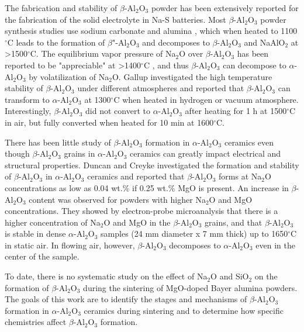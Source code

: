The fabrication and stability of $\beta$-Al$_{2}$O$_{3}$ powder has been extensively reported for the fabrication of the solid electrolyte in Na-S batteries. Most $\beta$-Al$_{2}$O$_{3}$ powder synthesis studies use sodium carbonate and alumina \cite{Vries1969,Kummer1972a,Ray1975}, which when heated to 1100$^{\circ}$C leads to the formation of $\beta$"-Al$_{2}$O$_{3}$ and decomposes to $\beta$-Al$_{2}$O$_{3}$ and NaAlO$_{2}$ at >1500$^{\circ}$C. The equilibrium vapor pressure of Na$_{2}$O over $\beta$-Al$_{2}$O$_{3}$ has been reported to be "appreciable" at >1400$^{\circ}$C \cite{Kummer1972a}, and thus $\beta$-Al$_{2}$O$_{3}$ can decompose to $\alpha$-Al$_{2}$O$_{3}$ by volatilization of Na$_{2}$O. Gallup \cite{Gallup1935} investigated the high temperature stability of $\beta$-Al$_{2}$O$_{3}$ under different atmospheres and reported that $\beta$-Al$_{2}$O$_{3}$ can transform to $\alpha$-Al$_{2}$O$_{3}$ at 1300$^{\circ}$C when heated in hydrogen or vacuum atmosphere. Interestingly, $\beta$-Al$_{2}$O$_{3}$ did not convert to $\alpha$-Al$_{2}$O$_{3}$ after heating for 1 h at 1500$^{\circ}$C in air, but fully converted when heated for 10 min at 1600$^{\circ}$C. 

There has been little study of $\beta$-Al$_{2}$O$_{3}$ formation in $\alpha$-Al$_{2}$O$_{3}$ ceramics even though $\beta$-Al$_{2}$O$_{3}$ grains in $\alpha$-Al$_{2}$O$_{3}$ ceramics can greatly impact electrical and structural properties. Duncan and Creyke \cite{Duncan1969a} investigated the formation and stability of $\beta$-Al$_{2}$O$_{3}$ in $\alpha$-Al$_{2}$O$_{3}$ ceramics and reported that $\beta$-Al$_{2}$O$_{3}$ forms at Na$_{2}$O concentrations as low as 0.04 wt.\% if 0.25 wt.\% MgO is present. An increase in $\beta$-Al$_{2}$O$_{3}$ content was observed for powders with higher Na$_{2}$O and MgO concentrations. They showed by electron-probe microanalysis that there is a higher concentration of Na$_{2}$O and MgO in the $\beta$-Al$_{2}$O$_{3}$ grains, and that $\beta$-Al$_{2}$O$_{3}$ is stable in dense $\alpha$-Al$_{2}$O$_{3}$ samples (24 mm diameter x 7 mm thick) up to 1650$^{\circ}$C in static air. In flowing air, however, $\beta$-Al$_{2}$O$_{3}$ decomposes to $\alpha$-Al$_{2}$O$_{3}$ even in the center of the sample.

To date, there is no systematic study on the effect of Na$_{2}$O and SiO$_{2}$ on the formation of $\beta$-Al$_{2}$O$_{3}$ during the sintering of MgO-doped Bayer alumina powders. The goals of this work are to identify the stages and mechanisms of $\beta$-Al$_{2}$O$_{3}$ formation in $\alpha$-Al$_{2}$O$_{3}$ ceramics during sintering and to determine how specific chemistries affect $\beta$-Al$_{2}$O$_{3}$ formation.

